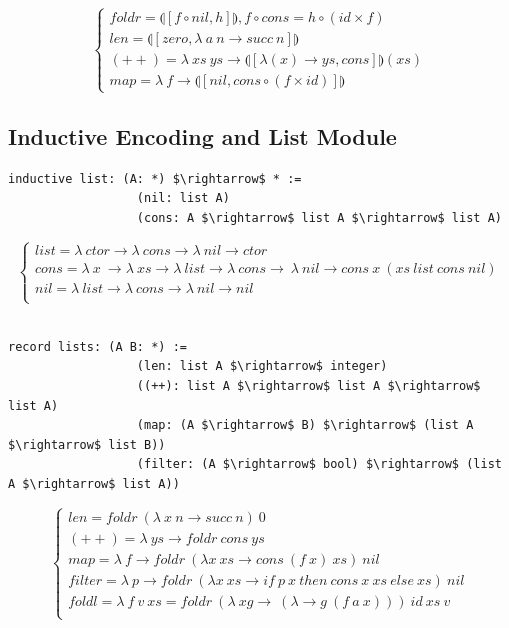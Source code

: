 \documentclass[11pt,oneside]{article}
\begin{document}
\vspace{0.5cm}
$$
\begin{cases}
 foldr = \llparenthesis [ f \circ nil , h] \rrparenthesis, f \circ cons = h \circ (id \times f)\\
 len = \llparenthesis [ zero, \lambda\ a\ n \rightarrow succ\ n ] \rrparenthesis \\
 (++) = \lambda\ xs\ ys \rightarrow \llparenthesis [ \lambda (x) \rightarrow ys, cons ] \rrparenthesis (xs) \\
 map = \lambda\ f \rightarrow \llparenthesis [ nil, cons \circ (f \times id)] \rrparenthesis
\end{cases}
$$

\vspace{0.2cm}
\subsection{Inductive Encoding and List Module}
\vspace{0.4cm}

\begin{lstlisting}[mathescape=true]
        inductive list: (A: *) $\rightarrow$ * :=
                  (nil: list A)
                  (cons: A $\rightarrow$ list A $\rightarrow$ list A)
\end{lstlisting}
$$
\begin{cases}
list = \lambda\ ctor \rightarrow \lambda\ cons \rightarrow \lambda\ nil \rightarrow ctor\\
cons = \lambda\ x\ \rightarrow \lambda\ xs \rightarrow \lambda\ list \rightarrow \lambda\ cons \rightarrow\ \lambda\ nil \rightarrow cons\ x\ (xs\ list\ cons\ nil)\\
nil = \lambda\ list \rightarrow \lambda\ cons \rightarrow \lambda\ nil \rightarrow nil\\
\end{cases}
$$
\\
\begin{lstlisting}[mathescape=true]
           record lists: (A B: *) :=
                  (len: list A $\rightarrow$ integer)
                  ((++): list A $\rightarrow$ list A $\rightarrow$ list A)
                  (map: (A $\rightarrow$ B) $\rightarrow$ (list A $\rightarrow$ list B))
                  (filter: (A $\rightarrow$ bool) $\rightarrow$ (list A $\rightarrow$ list A))
\end{lstlisting}
$$
\begin{cases}
len = foldr\ (\lambda\ x\ n \rightarrow succ\ n)\ 0\\
(++) = \lambda\ ys \rightarrow foldr\ cons\ ys\\
map = \lambda\ f \rightarrow foldr\ (\lambda x\ xs \rightarrow cons\ (f\ x)\ xs)\ nil\\
filter = \lambda\ p \rightarrow foldr\ (\lambda x\ xs \rightarrow if\ p\ x\ then\ cons\ x\ xs\ else\ xs)\ nil\\
foldl = \lambda\ f\ v\ xs = foldr\ (\lambda\ xg\rightarrow\ (\lambda \rightarrow g\ (f\ a\ x)))\ id\ xs\ v\\
\end{cases}
$$
\end{document}
